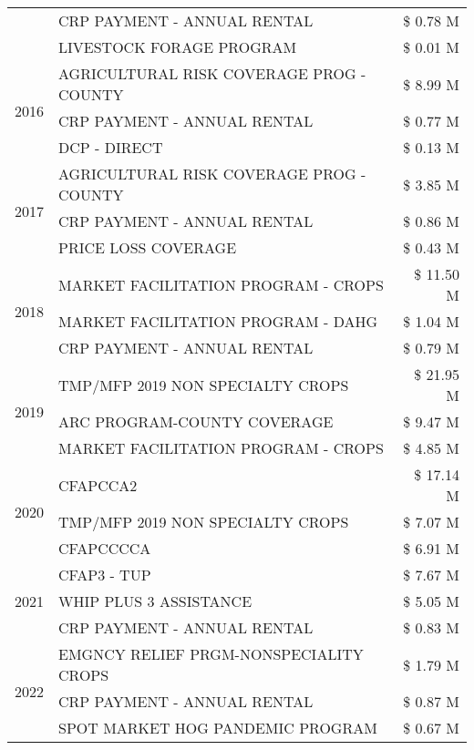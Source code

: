 \begin{tabular}{llr}
 & CRP PAYMENT - ANNUAL RENTAL & \$ 0.78 M \\
 & LIVESTOCK FORAGE PROGRAM & \$ 0.01 M \\
\cline{1-3}
\multirow[t]{3}{*}{2016} & AGRICULTURAL RISK COVERAGE PROG - COUNTY & \$ 8.99 M \\
 & CRP PAYMENT - ANNUAL RENTAL & \$ 0.77 M \\
 & DCP - DIRECT & \$ 0.13 M \\
\cline{1-3}
\multirow[t]{3}{*}{2017} & AGRICULTURAL RISK COVERAGE PROG - COUNTY & \$ 3.85 M \\
 & CRP PAYMENT - ANNUAL RENTAL & \$ 0.86 M \\
 & PRICE LOSS COVERAGE & \$ 0.43 M \\
\cline{1-3}
\multirow[t]{3}{*}{2018} & MARKET FACILITATION PROGRAM - CROPS & \$ 11.50 M \\
 & MARKET FACILITATION PROGRAM - DAHG & \$ 1.04 M \\
 & CRP PAYMENT - ANNUAL RENTAL & \$ 0.79 M \\
\cline{1-3}
\multirow[t]{3}{*}{2019} & TMP/MFP 2019 NON SPECIALTY CROPS & \$ 21.95 M \\
 & ARC PROGRAM-COUNTY COVERAGE & \$ 9.47 M \\
 & MARKET FACILITATION PROGRAM - CROPS & \$ 4.85 M \\
\cline{1-3}
\multirow[t]{3}{*}{2020} & CFAPCCA2 & \$ 17.14 M \\
 & TMP/MFP 2019 NON SPECIALTY CROPS & \$ 7.07 M \\
 & CFAPCCCCA & \$ 6.91 M \\
\cline{1-3}
\multirow[t]{3}{*}{2021} & CFAP3 - TUP & \$ 7.67 M \\
 & WHIP PLUS 3 ASSISTANCE & \$ 5.05 M \\
 & CRP PAYMENT - ANNUAL RENTAL & \$ 0.83 M \\
\cline{1-3}
\multirow[t]{3}{*}{2022} & EMGNCY RELIEF PRGM-NONSPECIALITY CROPS & \$ 1.79 M \\
 & CRP PAYMENT - ANNUAL RENTAL & \$ 0.87 M \\
 & SPOT MARKET HOG PANDEMIC PROGRAM & \$ 0.67 M \\
\cline{1-3}
\bottomrule
\end{tabular}

